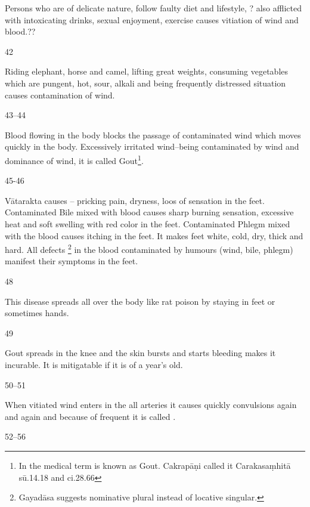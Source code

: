 \begin{translation}
	Persons who are of delicate nature, follow faulty diet and lifestyle, ?
	also afflicted with intoxicating drinks, 	sexual enjoyment,
	exercise causes vitiation of wind and blood.??

\item[42]

	Riding elephant, horse and camel, lifting great weights, consuming
	vegetables which are pungent, hot, sour, alkali and being frequently
	distressed situation causes contamination of wind. 

\item[43--44]

	Blood flowing in the body blocks the passage of contaminated wind which
	moves quickly in the body. Excessively irritated wind--being
	contaminated by wind and dominance of wind, it is called 
	Gout\footnote{In the medical term  is known as Gout.
	Cakrapāṇi called it  Carakasaṃhitā sū.14.18 and ci.28.66}.

\item[45-46]

	Vātarakta causes -- pricking pain, dryness, loos of sensation in the
	feet. Contaminated Bile mixed with blood causes sharp burning sensation,
	excessive heat and soft swelling with red color in the feet.
	Contaminated Phlegm mixed with the blood causes itching in the feet. It
	makes feet white, cold, dry, thick and hard. All defects
	\footnote{Gayadāsa suggests  nominative plural
	instead of locative singular.} in the blood contaminated by humours
	(wind, bile, phlegm) manifest their symptoms in the feet.

\item[48]

	This disease spreads all over the body like rat poison by staying in
	feet or sometimes hands.

\item[49]

	Gout spreads in the knee and the skin bursts and starts bleeding makes
	it incurable. It is mitigatable if it is of a year’s old.

\item[50--51]

	When vitiated wind enters in the all arteries it causes quickly
	convulsions again and again and because of frequent
	 it is called .

\item[52--56]


\end{translation}
